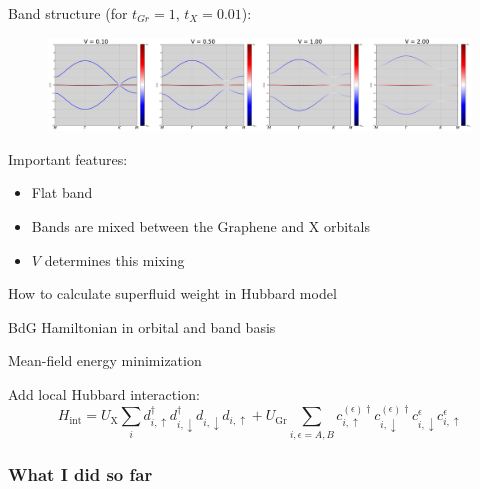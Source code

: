 \documentclass[aspectratio=169]{beamer}
\begin{document}
\begin{frame}
	Band structure (for \(t_{Gr} = 1\), \(t_{X} = 0.01\)):
	
	\begin{figure}
		\includegraphics[width=\textwidth]{figs/EG_X bands_tGr_1_tX_0.01}
	\end{figure}
	
	Important features:
	\begin{itemize}
		\item Flat band
		\item Bands are mixed between the Graphene and X orbitals
		\item \(V\) determines this mixing
	\end{itemize}
\end{frame}

\begin{frame}
	How to calculate superfluid weight in Hubbard model
	
	BdG Hamiltonian in orbital and band basis
	
	Mean-field energy minimization
\end{frame}

\begin{frame}
	Add local Hubbard interaction:
	\begin{equation}
		H_{\mathrm{int}} = U_{\mathrm{X}} \sum_{i} d_{i, \uparrow}^{\dagger} d_{i, \downarrow}^{\dagger} d_{i, \downarrow} d_{i, \uparrow}
		+ U_{\mathrm{Gr}} \sum_{i, \epsilon=A, B} c_{i, \uparrow}^{(\epsilon) \dagger} c_{i, \downarrow}^{(\epsilon) \dagger} c_{i, \downarrow}^{\epsilon} c_{i, \uparrow}^{\epsilon}
	\end{equation}
\end{frame}


\begin{frame}
	\frametitle{What I did so far}
\end{frame}
\end{document}
